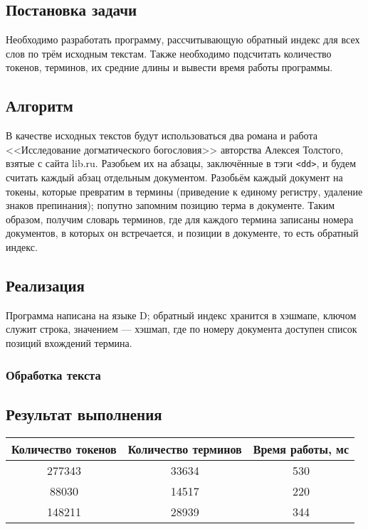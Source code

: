 \documentclass[a4paper, 12pt]{article}
\begin{document}

\newpage


\subsection*{Постановка задачи}
Необходимо разработать программу, рассчитывающую обратный индекс для всех слов по трём исходным текстам. Также необходимо подсчитать количество токенов, терминов, их средние длины и вывести время работы программы.


\subsection*{Алгоритм}
В качестве исходных текстов будут использоваться два романа и работа <<Исследование догматического богословия>> авторства Алексея Толстого, взятые с сайта lib.ru. Разобьем их на абзацы, заключённые в тэги {\tt <dd>}, и будем считать каждый абзац отдельным документом. Разобьём каждый документ на токены, которые превратим в термины (приведение к единому регистру, удаление знаков препинания); попутно запомним позицию терма в документе. Таким образом, получим словарь терминов, где для каждого термина записаны номера документов, в которых он встречается, и позиции в документе, то есть обратный индекс.


\subsection*{Реализация}
Программа написана на языке D; обратный индекс хранится в хэшмапе, ключом служит строка, значением --- хэшмап, где по номеру документа доступен список позиций вхождений термина.


\subsubsection*{Обработка текста}



\subsection*{Результат выполнения}


\vspace{1cm}

\begin{tabular}{|c|c|c|}
\hline
Количество токенов & Количество терминов & Время работы, мс \\
\hline
277343 & 33634 & 530 \\
88030 & 14517 & 220 \\
148211 & 28939 & 344 \\
\hline
\end{tabular}
\end{document}
